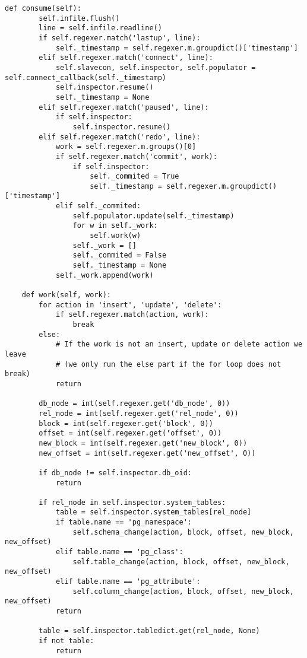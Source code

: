 \begin{lstlisting}[caption={history.py}]
    def consume(self):
        self.infile.flush()
        line = self.infile.readline()
        if self.regexer.match('lastup', line):
            self._timestamp = self.regexer.m.groupdict()['timestamp']
        elif self.regexer.match('connect', line):
            self.slavecon, self.inspector, self.populator = self.connect_callback(self._timestamp)
            self.inspector.resume()
            self._timestamp = None
        elif self.regexer.match('paused', line):
            if self.inspector:
                self.inspector.resume()
        elif self.regexer.match('redo', line):
            work = self.regexer.m.groups()[0]
            if self.regexer.match('commit', work):
                if self.inspector:
                    self._commited = True
                    self._timestamp = self.regexer.m.groupdict()['timestamp']
            elif self._commited:
                self.populator.update(self._timestamp)
                for w in self._work:
                    self.work(w)
                self._work = []
                self._commited = False
                self._timestamp = None
            self._work.append(work)

    def work(self, work):
        for action in 'insert', 'update', 'delete':
            if self.regexer.match(action, work):
                break
        else:
            # If the work is not an insert, update or delete action we leave
            # (we only run the else part if the for loop does not break)
            return

        db_node = int(self.regexer.get('db_node', 0))
        rel_node = int(self.regexer.get('rel_node', 0))
        block = int(self.regexer.get('block', 0))
        offset = int(self.regexer.get('offset', 0))
        new_block = int(self.regexer.get('new_block', 0))
        new_offset = int(self.regexer.get('new_offset', 0))

        if db_node != self.inspector.db_oid:
            return

        if rel_node in self.inspector.system_tables:
            table = self.inspector.system_tables[rel_node]
            if table.name == 'pg_namespace':
                self.schema_change(action, block, offset, new_block, new_offset)
            elif table.name == 'pg_class':
                self.table_change(action, block, offset, new_block, new_offset)
            elif table.name == 'pg_attribute':
                self.column_change(action, block, offset, new_block, new_offset)
            return

        table = self.inspector.tabledict.get(rel_node, None)
        if not table:
            return


\end{lstlisting}
